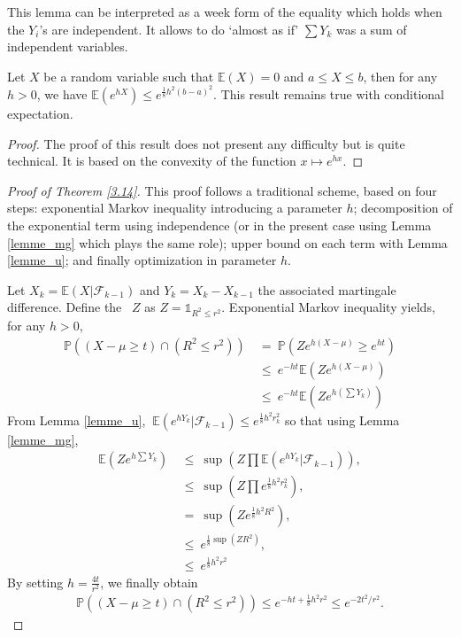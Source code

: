This lemma can be interpreted as a week form of the equality which holds when the $Y_i$'s are independent. It allows to do `almost as if' $\sum Y_k$ was a sum of independent variables.

\begin{lemma} 
 \label{lemme_u}
Let $X$ be a random variable such that $\mathbb{E}(X) = 0 $ and $a \leq X \leq b$, then for any $h>0$, we have $\mathbb{E}(e^{hX}) \leq e^{\frac{1}{8}h^2(b-a)^2} $.
This result remains true with conditional expectation.%
\end{lemma}
\begin{proof}
The proof of this result does not present any difficulty but is quite technical. It is based on the convexity of the function
$x \mapsto e^{hx}$.
\end{proof}

\begin{proof}[Proof of Theorem \ref{3.14}]
This proof follows a traditional scheme, based on four steps: exponential Markov inequality introducing a parameter $h$; decomposition of the exponential term using independence (or in the present case using Lemma \ref{lemme_mg} which plays the same role); upper bound on each term with Lemma \ref{lemme_u}; and finally optimization in parameter $h$.

Let $X_k=\mathbb{E}(X|\mathcal{F}_{k-1})$ and $Y_k=X_k-X_{k-1}$ the associated martingale difference.
Define the \rv~$Z$ as $Z=\mathds{1}_{R^2 \leq r^2}$. Exponential Markov inequality yields, for any $h>0$,
\begin{align*}
\mathbb{P}((X-\mu \geq t)\cap(R^2 \leq r^2)) 
 &~=~ \mathbb{P}(Ze^{h(X-\mu)} \geq e^{ht})\\
 &~\leq~ e^{-ht}\mathbb{E}(Ze^{h(X-\mu)})\\
 &~\leq~ e^{-ht}\mathbb{E}(Ze^{h(\sum Y_k)}) 
 \end{align*}
From Lemma \ref{lemme_u}, $~\mathbb{E}(e^{hY_k}|\mathcal{F}_{k-1}) \leq e^{\frac{1}{8}h^2r_k^2}$ so that using Lemma \ref{lemme_mg},
\begin{align*}
 \mathbb{E}(Ze^{h\sum Y_k}) &~\leq~ \sup(Z \prod \mathbb{E}(e^{hY_k}|\mathcal{F}_{k-1})),\\
&~\leq~  \sup(Z \prod e^{\frac{1}{8}h^2 r_k^2}),\\
&~=~ \sup(Z e^{\frac{1}{8}h^2R^2}),\\
&~\leq~ e^{\frac{1}{8}\sup(ZR^2)},\\
&~\leq~ e^{\frac{1}{8}h^2r^2}
\end{align*}
By setting $h=\frac{4t}{r^2}$, we finally obtain
\begin{align*}
\mathbb{P}((X-\mu \geq t)\cap(R^2 \leq r^2)) \leq e^{-ht+\frac{1}{8}h^2r^2} \leq e^{-2t^2/r^2}.
\end{align*} 

\end{proof}


